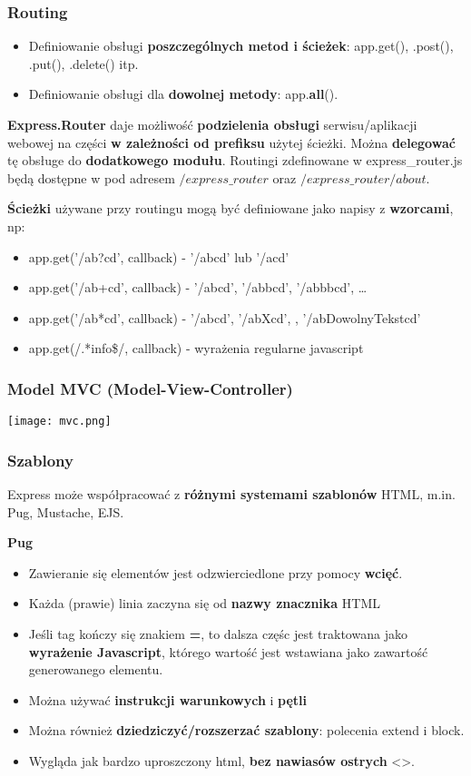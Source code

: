 \documentclass[../main.tex]{subfiles}
\begin{document}
    \subsubsection{Routing}
    \begin{itemize}
        \item Definiowanie obsługi \textbf{poszczególnych metod i ścieżek}: app.get(), .post(), .put(), .delete() itp.
        \item Definiowanie obsługi dla \textbf{dowolnej metody}: app.\textbf{all}().
    \end{itemize}

    \textbf{Express.Router} daje możliwość \textbf{podzielenia obsługi} serwisu/aplikacji webowej na części \textbf{w
    zależności od prefiksu} użytej ścieżki. Można \textbf{delegować} tę obsługe do \textbf{dodatkowego modułu}. Routingi
    zdefinowane w express\_router.js będą dostępne w pod adresem $/express\_router$ oraz $/express\_router/about$.

    \textbf{Ścieżki} używane przy routingu mogą być definiowane jako napisy z \textbf{wzorcami}, np:
    \begin{itemize}
        \item app.get('/ab?cd', callback) - '/abcd' lub '/acd'
        \item app.get('/ab+cd', callback) - '/abcd', '/abbcd', '/abbbcd', \dots
        \item app.get('/ab*cd', callback) - '/abcd', '/abXcd', , '/abDowolnyTekstcd'
        \item app.get(/.*info\$/, callback) - wyrażenia regularne javascript
    \end{itemize}

    \subsubsection{Model MVC (Model-View-Controller)}
    \texttt{[image: mvc.png]}

    \subsubsection{Szablony}
    Express może współpracować z \textbf{różnymi systemami szablonów} HTML, m.in. Pug, Mustache, EJS.

    \textbf{Pug}
    \begin{itemize}
        \item Zawieranie się elementów jest odzwierciedlone przy pomocy \textbf{wcięć}.
        \item Każda (prawie) linia zaczyna się od \textbf{nazwy znacznika} HTML
        \item Jeśli tag kończy się znakiem \textbf{=}, to dalsza częśc jest traktowana jako \textbf{wyrażenie Javascript}, którego wartość jest wstawiana jako zawartość generowanego elementu.
        \item Można używać \textbf{instrukcji warunkowych} i \textbf{pętli}
        \item Można również \textbf{dziedziczyć/rozszerzać szablony}: polecenia extend i block.
        \item Wygląda jak bardzo uproszczony html, \textbf{bez nawiasów ostrych} <>.
    \end{itemize}
\end{document}
